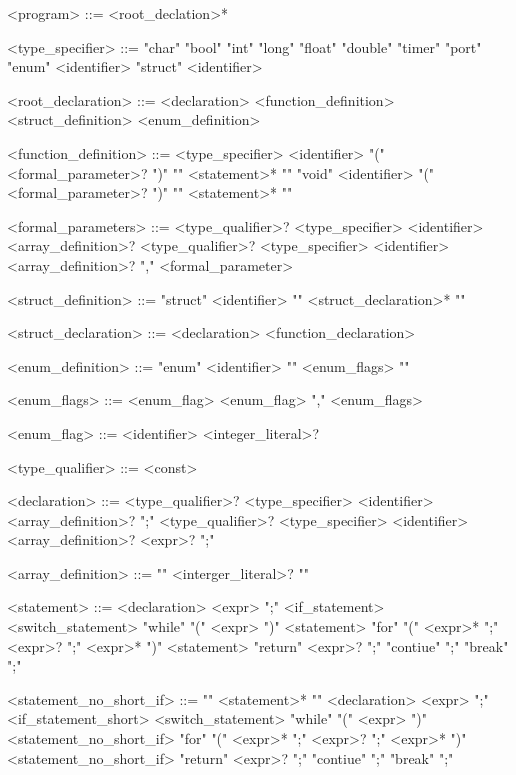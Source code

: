 \begin{grammar}
 
 
 
 
 <program> ::= <root\_declation>*
 
 <type\_specifier> ::= "char"
 \alt "bool"
 \alt "int"
 \alt "long"
 \alt "float"
 \alt "double"
 \alt "timer"
 \alt "port"
 \alt "enum" <identifier>
 \alt "struct" <identifier>
 
 <root\_declaration> ::= <declaration>
 \alt <function\_definition>
 \alt <struct\_definition>
 \alt <enum\_definition>
 
 <function\_definition> ::= <type\_specifier> <identifier> "(" <formal\_parameter>? ")" "{" <statement>* "}"
 \alt "void" <identifier> "(" <formal\_parameter>? ")" "{" <statement>* "}"
 
 <formal\_parameters> ::= <type\_qualifier>? <type\_specifier> <identifier> <array\_definition>?
 \alt <type\_qualifier>? <type\_specifier> <identifier> <array\_definition>? "," <formal\_parameter>
 
 <struct\_definition> ::= "struct" <identifier> "{" <struct\_declaration>* "}"
 
 <struct\_declaration> ::= <declaration>
 \alt <function\_declaration>
 
 <enum\_definition> ::= "enum" <identifier> "{" <enum\_flags> "}"
 
 <enum\_flags> ::= <enum\_flag>
 \alt <enum\_flag> "," <enum\_flags>
 
 <enum\_flag> ::= <identifier> <integer\_literal>?
 
 <type\_qualifier> ::= <const>
 
 <declaration> ::= <type\_qualifier>? <type\_specifier> <identifier> <array\_definition>? ";"
 \alt <type\_qualifier>? <type\_specifier> <identifier> <array\_definition>? <expr>? ";"
 
 <array\_definition> ::= "{" <interger\_literal>? "}"
 
 <statement> ::= <declaration>
 \alt <expr> ";"
 \alt <if\_statement>
 \alt <switch\_statement>
 \alt "while" "(" <expr> ")" <statement>
 \alt "for" "(" <expr>* ";" <expr>? ";" <expr>* ")" <statement>
 \alt "return" <expr>? ";"
 \alt "contiue" ";"
 \alt "break" ";"
 
 <statement\_no\_short\_if> ::= "{" <statement>* "}"
 \alt <declaration>
 \alt <expr> ";"
 \alt <if\_statement\_short>
 \alt <switch\_statement>
 \alt "while" "(" <expr> ")" <statement\_no\_short\_if>
 \alt "for" "(" <expr>* ";" <expr>? ";" <expr>* ")" <statement\_no\_short\_if>
 \alt "return" <expr>? ";"
 \alt "contiue" ";"
 \alt "break" ";"
 

\end{grammar}
